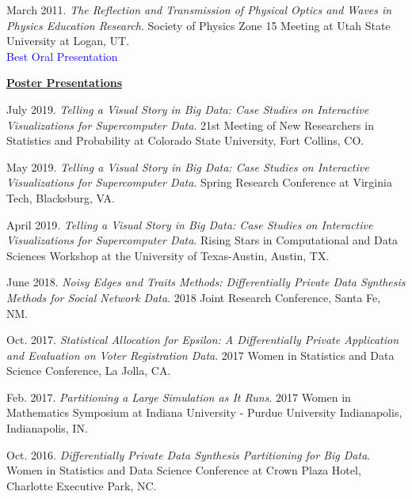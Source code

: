 \begin{etaremune}[topsep=0pt, itemsep=3pt, partopsep=0pt, parsep=0pt]
    \item March 2011. \textit{The Reflection and Transmission of Physical Optics and Waves in Physics Education Research}. Society of Physics Zone 15 Meeting at Utah State University at Logan, UT.\\
    \textcolor{blue}{Best Oral Presentation}
  
\vspace{8pt}
\hspace{-0.30in}\underline{\textbf{\large Poster Presentations}}\normalsize
    \item July 2019. \textit{Telling a Visual Story in Big Data: Case Studies on Interactive Visualizations for Supercomputer Data}. 21st Meeting of New Researchers in Statistics and Probability at Colorado State University, Fort Collins, CO.
    
    \item May 2019. \textit{Telling a Visual Story in Big Data: Case Studies on Interactive Visualizations for Supercomputer Data}. Spring Research Conference at Virginia Tech, Blacksburg, VA.
    
    \item April 2019. \textit{Telling a Visual Story in Big Data: Case Studies on Interactive Visualizations for Supercomputer Data}. Rising Stars in Computational and Data Sciences Workshop at the University of Texas-Austin, Austin, TX.
    
    \item June 2018. \textit{Noisy Edges and Traits Methods: Differentially Private Data Synthesis Methods for Social Network Data}. 2018 Joint Research Conference, Santa Fe, NM.
    
    \item Oct. 2017. \textit{Statistical Allocation for Epsilon: A Differentially Private Application and Evaluation on Voter Registration Data}. 2017 Women in Statistics and Data Science Conference, La Jolla, CA.
    
    \item Feb. 2017. \textit{Partitioning a Large Simulation as It Runs}. 2017 Women in Mathematics Symposium at Indiana University - Purdue University Indianapolis, Indianapolis, IN.
    
    \item Oct. 2016. \textit{Differentially Private Data Synthesis Partitioning for Big Data}. Women in Statistics and Data Science Conference at Crown Plaza Hotel, Charlotte Executive Park, NC. 
    

\end{etaremune}
